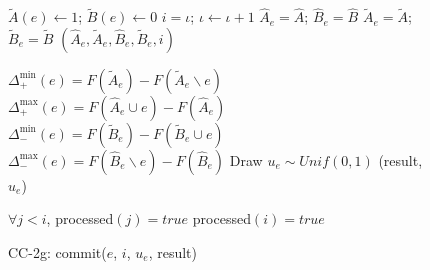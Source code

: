 \documentclass{article} %
\newcommand{\occ}{CC-2g}
\begin{document}
\begin{figure}[h]
\begin{multicols}{2}
\begin{minipage}{0.49\textwidth}
    \end{minipage}

    \begin{minipage}{0.49\textwidth}
      \begin{algorithm}[H]
        \DontPrintSemicolon
        \caption{\occ{} getGuarantee($e$)}
        \label{alg:occsnapshot}
        $\tilde{A}(e) \leftarrow 1$;
        $\tilde{B}(e) \leftarrow 0$\;
        $i = \iota$;
        $\iota \leftarrow \iota + 1$\;\label{alg:occ:time}
        $\hat{A}_e = \hat{A}$;
        $\hat{B}_e = \hat{B}$\;
        $\tilde{A}_e = \tilde{A}$;
        $\tilde{B}_e = \tilde{B}$\;
        \Return $(\hat{A}_e, \tilde{A}_e, \hat{B}_e, \tilde{B}_e, i)$
      \end{algorithm}

      \begin{algorithm}[H]
        \DontPrintSemicolon
        \caption{\occ{} propose}
        \label{alg:propose}
        $\Delta_+^{\min}(e) = F(\tilde{A}_e) - F(\tilde{A}_e \backslash e)$\;\label{alg:occ:deltaplusmin}
        $\Delta_+^{\max}(e) = F(\hat{A}_e   \cup e) - F(\hat{A}_e)$\;\label{alg:occ:deltaplusmax}
        $\Delta_-^{\min}(e) = F(\tilde{B}_e) - F(\tilde{B}_e \cup e)$\;\label{alg:occ:deltaminusmin}
        $\Delta_-^{\max}(e) = F(\hat{B}_e   \backslash e) - F(\hat{B}_e)$\;\label{alg:occ:deltaminusmax}
        Draw $u_e \sim Unif(0,1)$\;
        \Return (result, $u_e$)
      \end{algorithm}

      \begin{algorithm}[H]
        \DontPrintSemicolon
        \caption{\occ{}: commit($e$, $i$, $u_e$, result)}
        \label{alg:occcommit}
        \WaitUntil $\forall j < i$, processed$(j) = true$\;\label{alg:occ:processedwait}
        processed$(i) = true$\;
      \end{algorithm}



\end{minipage}
\end{multicols}
\end{figure}
\end{document}
